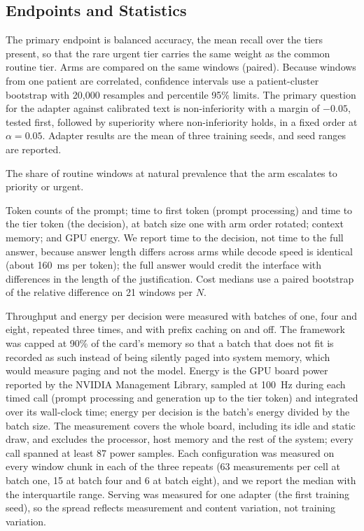 \subsection{Endpoints and Statistics}
 The primary endpoint is balanced accuracy, the mean recall over the tiers present, so that the rare urgent tier carries the same weight as the common routine tier. Arms are compared on the same windows (paired). Because windows from one patient are correlated, confidence intervals use a patient-cluster bootstrap with 20,000 resamples and percentile 95\% limits. The primary question for the adapter against calibrated text is non-inferiority with a margin of $-0.05$, tested first, followed by superiority where non-inferiority holds, in a fixed order at $\alpha = 0.05$. Adapter results are the mean of three training seeds, and seed ranges are reported.

 The share of routine windows at natural prevalence that the arm escalates to priority or urgent.

 Token counts of the prompt; time to first token (prompt processing) and time to the tier token (the decision), at batch size one with arm order rotated; context memory; and GPU energy. We report time to the decision, not time to the full answer, because answer length differs across arms while decode speed is identical (about 160~ms per token); the full answer would credit the interface with differences in the length of the justification. Cost medians use a paired bootstrap of the relative difference on 21 windows per $N$.

 Throughput and energy per decision were measured with batches of one, four and eight, repeated three times, and with prefix caching on and off. The framework was capped at 90\% of the card's memory so that a batch that does not fit is recorded as such instead of being silently paged into system memory, which would measure paging and not the model. Energy is the GPU board power reported by the NVIDIA Management Library, sampled at 100~Hz during each timed call (prompt processing and generation up to the tier token) and integrated over its wall-clock time; energy per decision is the batch's energy divided by the batch size. The measurement covers the whole board, including its idle and static draw, and excludes the processor, host memory and the rest of the system; every call spanned at least 87 power samples. Each configuration was measured on every window chunk in each of the three repeats (63 measurements per cell at batch one, 15 at batch four and 6 at batch eight), and we report the median with the interquartile range. Serving was measured for one adapter (the first training seed), so the spread reflects measurement and content variation, not training variation.

